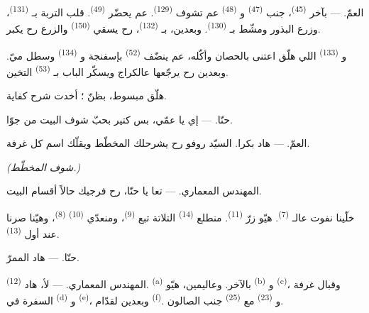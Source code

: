 \VUsaut{3.0mm}

\textsc{العمّ}. --- بآخر  \textsuperscript{(45)}، جنب
 \textsuperscript{(47)} و \textsuperscript{(48)}
عم تشوف  \textsuperscript{(129)}. عم يحضّر
 \textsuperscript{(49)}. قلب التربة بـ
\textsuperscript{(131)}، وزرع البذور ومشّط بـ
\textsuperscript{(130)}. وبعدين، بـ \textsuperscript{(132)}،
رح يسقي  \textsuperscript{(150)} والزرع رح يكبر.

و \textsuperscript{(133)} اللي هلّق اعتنى بالحصان وأكّله،
عم ينضّف  \textsuperscript{(52)} بإسفنجة و \textsuperscript{(134)} وسطل ميّ. وبعدين رح يرجّعها عالكراج
ويسكّر الباب بـ \textsuperscript{(53)} التخين.

هلّق مبسوط، بظنّ ؛ أخدت شرح كفاية.

\textsc{حنّا}. --- إي يا عمّي، بس كتير بحبّ شوف البيت من جوّا.

\textsc{العمّ}. --- هاد بكرا. السيّد روفو رح يشرحلك المخطّط ويقلّك اسم
كل غرفة.

\VUsaut{3.0mm}
\VUsaut{2.4mm}

{\centering\textit{(شوف المخطّط.)}\par}
\VUsaut{2.4mm}

\textsc{المهندس المعماري}. --- تعا يا حنّا، رح فرجيك حالاً أقسام
البيت.

خلّينا نفوت عالـ \textsuperscript{(7)}. هيّو زرّ
 \textsuperscript{(11)}. منطلع 
\textsuperscript{(14)} التلاتة تبع  \textsuperscript{(9)}،
ومنعدّي  \textsuperscript{(10)} 
\textsuperscript{(8)}، وهيّنا صرنا عند أول 
\textsuperscript{(13)}.

\textsc{حنّا}. --- هاد الممرّ.

\textsc{المهندس المعماري}. --- لأ، هاد 
\textsuperscript{(12)}.  \textsuperscript{(a)} بالآخر.
وعاليمين، هيّو  \textsuperscript{(b)} و \textsuperscript{(c)}، وقبال غرفة السفرة في 
\textsuperscript{(d)} و \textsuperscript{(e)}، وبعدين
لقدّام  \textsuperscript{(f)}. و
\textsuperscript{(23)} مع  \textsuperscript{(25)} جنب
الصالون.

